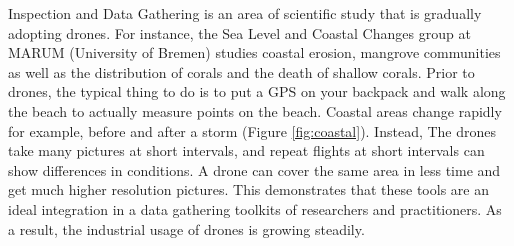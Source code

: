 Inspection and Data Gathering is an area of scientific study that is gradually adopting drones. For instance, the Sea Level and Coastal Changes group at MARUM (University of Bremen) \cite{scientific_research} studies coastal erosion, mangrove communities as well as the distribution of corals and the death of shallow corals. Prior to drones, the typical thing to do is to put a GPS on your backpack and walk along the beach to actually measure points on the beach. Coastal areas change rapidly for example, before and after a storm (Figure \ref{fig:coastal}). Instead, The drones take many pictures at short intervals, and repeat flights at short intervals can show differences in conditions. A drone can cover the same area in less time and get much higher resolution pictures. This demonstrates that these tools are an ideal integration in a data gathering toolkits of researchers and practitioners. As a result, the industrial usage of drones is growing steadily. 






